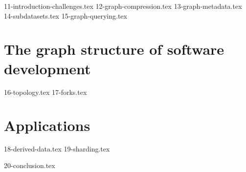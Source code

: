 \documentclass[a4paper,11pt,openbib,draft]{memoir}
\begin{document}
{11-introduction-challenges.tex}
{12-graph-compression.tex}
{13-graph-metadata.tex}
{14-subdatasets.tex}
{15-graph-querying.tex}

\part{The graph structure of software development}

{16-topology.tex}
{17-forks.tex}

\part{Applications}

{18-derived-data.tex}
{19-sharding.tex}

{20-conclusion.tex}
\fi



%
%
\iffalse
\appendix
\clearemptydoublepage
\fi


%
\backmatter






\clearemptydoublepage
\newpage
\thispagestyle{empty}
\vspace*{\fill}


%
%
\end{document}
